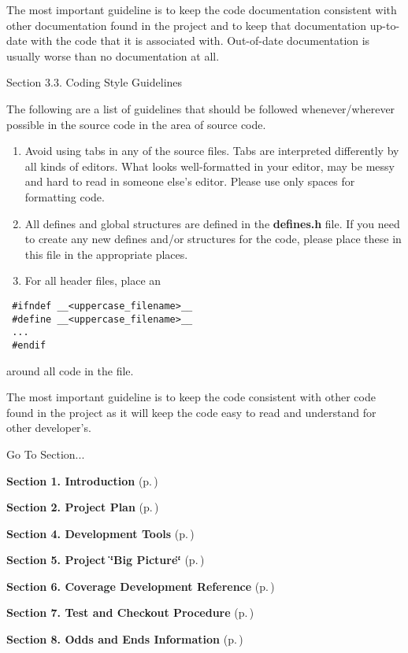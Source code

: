  The most important guideline is to keep the code documentation consistent with other documentation found in the project and to keep that documentation up-to-date with the code that it is associated with. Out-of-date documentation is usually worse than no documentation at all.



\begin{Desc}
\item[Section 3.3.  Coding Style Guidelines]\par
 The following are a list of guidelines that should be followed whenever/wherever possible in the source code in the area of source code.

\begin{enumerate}
\item 
Avoid using tabs in any of the source files. Tabs are interpreted differently by all kinds of editors. What looks well-formatted in your editor, may be messy and hard to read in someone else's editor. Please use only spaces for formatting code.\item 
All defines and global structures are defined in the {\bf defines.h} file. If you need to create any new defines and/or structures for the code, please place these in this file in the appropriate places.\item 
For all header files, place an\end{enumerate}
\end{Desc}


\footnotesize\begin{verbatim} #ifndef __<uppercase_filename>__
 #define __<uppercase_filename>__
 ...
 #endif
\end{verbatim}\normalsize 


 around all code in the file.

 The most important guideline is to keep the code consistent with other code found in the project as it will keep the code easy to read and understand for other developer's.



\begin{Desc}
\item[Go To Section...]\par
\begin{CompactItemize}
\item 
{\bf Section 1.  Introduction} {\rm (p.\,\pageref{page_intro})}\item 
{\bf Section 2.  Project Plan} {\rm (p.\,\pageref{page_project_plan})}\item 
{\bf Section 4.  Development Tools} {\rm (p.\,\pageref{page_tools})}\item 
{\bf Section 5.  Project \char`\"{}Big Picture\char`\"{}} {\rm (p.\,\pageref{page_big_picture})}\item 
{\bf Section 6.  Coverage Development Reference} {\rm (p.\,\pageref{page_code_details})}\item 
{\bf Section 7.  Test and Checkout Procedure} {\rm (p.\,\pageref{page_testing})}\item 
{\bf Section 8.  Odds and Ends Information} {\rm (p.\,\pageref{page_misc})}\end{CompactItemize}
\end{Desc}
